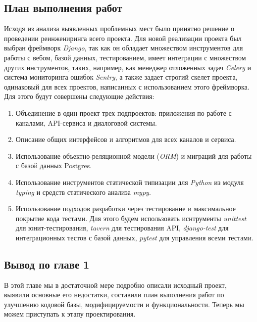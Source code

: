     \subsection{План выполнения работ}
    Исходя из анализа выявленных проблемных мест было принятно решение о проведении реинжениринга всего проекта.
    Для новой реализации проекта был выбран фреймворк \textit{Django}\cite{docs.django}, так как он обладает множеством инструментов
    для работы с вебом, базой данных, тестированием, имеет интеграции с множеством других инструментов, таких, например,
    как менеджер отложенных задач \textit{Celery}\cite{docs.celery} и система мониторинга ошибок \textit{Sentry},
    а также задает строгий скелет проекта, одинаковый для всех проектов, написанных с использованием этого фреймворка.
    Для этого будут совершены следующие действия:
    \begin{enumerate}
        \item Объединение в один проект трех подпроектов: приложения по работе с каналами, API-сервиса и диалоговой системы.
        \item Описание общих интерфейсов и алгоритмов для всех каналов и сервиса.
        \item Использование объектно-реляционной модели (\textit{ORM}) и миграций для работы с базой данных Postgres\cite{postgres.stepic}.
        \item Использование инструментов статической типизации для \textit{Python} из модуля \textit{typing}
        и средств статического анализа \textit{mypy}\cite{docs.python}.
        \item Использование подходов разработки через тестирование и максимальное покрытие кода тестами. Для этого
        будем использовать иснтрументы \textit{unittest}\cite{docs.python} для юнит-тестирования, \textit{tavern} для тестирования API,
        \textit{django-test} для интеграционных тестов с базой данных, \textit{pytest} для управления всеми тестами.
    \end{enumerate}

    \subsection*{Вывод по главе 1}
    В этой главе мы в достаточной мере подробно описали исходный проект, выявили основные его
    недостатки, составили план выполнения работ по улучшению кодовой базы, модифицируемости
    и функциональности. Теперь мы можем приступать к этапу проектирования.
